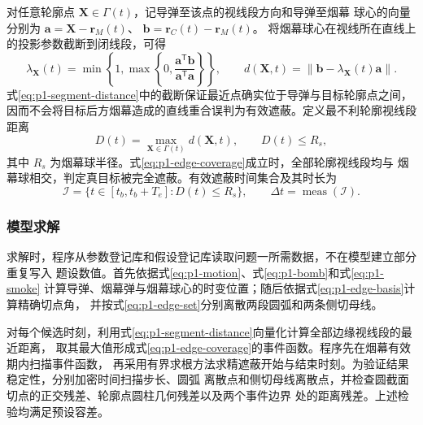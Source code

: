 对任意轮廓点 $\boldsymbol X\in\Gamma(t)$，记导弹至该点的视线段方向和导弹至烟幕
球心的向量分别为
$\boldsymbol a=\boldsymbol X-\boldsymbol r_M(t)$、
$\boldsymbol b=\boldsymbol r_C(t)-\boldsymbol r_M(t)$。
将烟幕球心在视线所在直线上的投影参数截断到闭线段，可得
\begin{equation}
  \lambda_{\boldsymbol X}(t)=
  \min\!\left\{1,\max\!\left\{0,
  \frac{\boldsymbol a^{\mathsf T}\boldsymbol b}
       {\boldsymbol a^{\mathsf T}\boldsymbol a}\right\}\right\},
  \qquad
  d(\boldsymbol X,t)=
  \left\lVert\boldsymbol b-\lambda_{\boldsymbol X}(t)\boldsymbol a\right\rVert.
  \label{eq:p1-segment-distance}
\end{equation}
式\eqref{eq:p1-segment-distance}中的截断保证最近点确实位于导弹与目标轮廓点之间，
因而不会将目标后方烟幕造成的直线重合误判为有效遮蔽。定义最不利轮廓视线段距离
\begin{equation}
  D(t)=\max_{\boldsymbol X\in\Gamma(t)}d(\boldsymbol X,t),
  \qquad D(t)\le R_s,
  \label{eq:p1-edge-coverage}
\end{equation}
其中 $R_s$ 为烟幕球半径。式\eqref{eq:p1-edge-coverage}成立时，全部轮廓视线段均与
烟幕球相交，判定真目标被完全遮蔽。有效遮蔽时间集合及其时长为
\begin{equation}
  \mathcal I=\{t\in[t_b,t_b+T_e]:D(t)\le R_s\},
  \qquad \Delta t=\operatorname{meas}(\mathcal I).
  \label{eq:p1-duration}
\end{equation}

\subsubsection{模型求解}

求解时，程序从参数登记库和假设登记库读取问题一所需数据，不在模型建立部分重复写入
题设数值。首先依据式\eqref{eq:p1-motion}、式\eqref{eq:p1-bomb}和式\eqref{eq:p1-smoke}
计算导弹、烟幕弹与烟幕球心的时变位置；随后依据式\eqref{eq:p1-edge-basis}计算精确切点角，
并按式\eqref{eq:p1-edge-set}分别离散两段圆弧和两条侧切母线。

对每个候选时刻，利用式\eqref{eq:p1-segment-distance}向量化计算全部边缘视线段的最近距离，
取其最大值形成式\eqref{eq:p1-edge-coverage}的事件函数。程序先在烟幕有效期内扫描事件函数，
再采用有界求根方法求精遮蔽开始与结束时刻。为验证结果稳定性，分别加密时间扫描步长、圆弧
离散点和侧切母线离散点，并检查圆截面切点的正交残差、轮廓点圆柱几何残差以及两个事件边界
处的距离残差。上述检验均满足预设容差。

